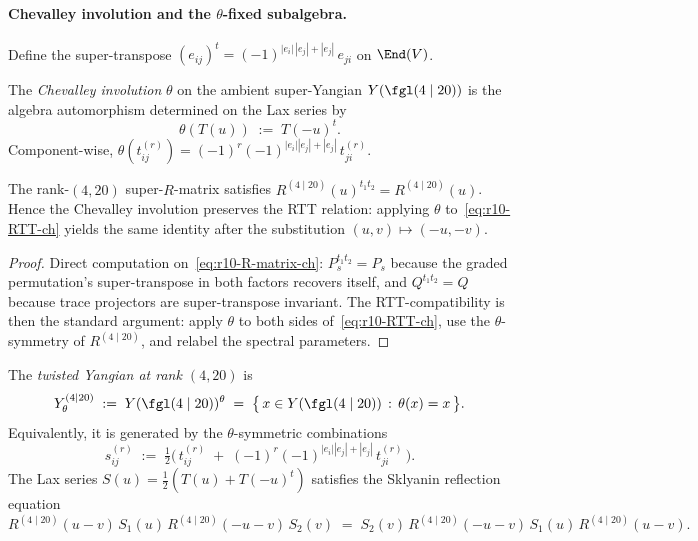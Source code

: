 \paragraph{Chevalley involution and the $\theta$-fixed subalgebra.}
Define the super-transpose
$(e_{ij})^t = (-1)^{|e_i|\,|e_j| + |e_j|}\, e_{ji}$ on $\End(V)$.

\begin{definition}
\label{def:r10-theta-ch}
The \emph{Chevalley involution} $\theta$ on the ambient super-Yangian
$Y(\fgl(4 \mid 20))$ is the algebra automorphism determined on the
Lax series by
\begin{equation}
 \label{eq:r10-theta-Lax-ch}
 \theta(T(u)) \;:=\; T(-u)^{t}.
\end{equation}
Component-wise,
$\theta(t^{(r)}_{ij}) = (-1)^r (-1)^{|e_i||e_j| + |e_j|}\, t^{(r)}_{ji}$.
\end{definition}

\begin{proposition}
\label{prop:r10-theta-R-symm-ch}
The rank-$(4, 20)$ super-$R$-matrix satisfies
$R^{(4 \mid 20)}(u)^{t_1 t_2} = R^{(4 \mid 20)}(u)$.
Hence the Chevalley involution preserves the RTT relation: applying
$\theta$ to~\eqref{eq:r10-RTT-ch} yields the same identity after the
substitution $(u, v) \mapsto (-u, -v)$.
\end{proposition}

\begin{proof}
Direct computation on~\eqref{eq:r10-R-matrix-ch}:
$P_s^{t_1 t_2} = P_s$ because the graded permutation's
super-transpose in both factors recovers itself, and
$Q^{t_1 t_2} = Q$ because trace projectors are super-transpose
invariant. The RTT-compatibility is then the standard argument:
apply $\theta$ to both sides of~\eqref{eq:r10-RTT-ch}, use the
$\theta$-symmetry of $R^{(4 \mid 20)}$, and relabel the spectral
parameters.
\end{proof}

\begin{definition}
\label{def:r10-Y-theta-ch}
The \emph{twisted Yangian at rank $(4, 20)$} is
\begin{equation}
 \label{eq:r10-Y-theta-ch}
 Y_\theta^{(4 \mid 20)}
 \;:=\;
 Y(\fgl(4 \mid 20))^\theta
 \;=\;
 \bigl\{\, x \in Y(\fgl(4 \mid 20)) \,:\, \theta(x) = x\, \bigr\}.
\end{equation}
Equivalently, it is generated by the $\theta$-symmetric combinations
\begin{equation}
 \label{eq:r10-s-generators-ch}
 s^{(r)}_{ij}
 \;:=\;
 \tfrac{1}{2}
 \bigl(\, t^{(r)}_{ij}
 \;+\; (-1)^r (-1)^{|e_i||e_j| + |e_j|}\, t^{(r)}_{ji} \,\bigr).
\end{equation}
The Lax series $S(u) = \tfrac{1}{2}(T(u) + T(-u)^t)$ satisfies the
Sklyanin reflection equation
\begin{equation}
 \label{eq:r10-reflection-eq-ch}
 R^{(4 \mid 20)}(u - v)\, S_1(u)\, R^{(4 \mid 20)}(-u - v)\,
 S_2(v)
 \;=\;
 S_2(v)\, R^{(4 \mid 20)}(-u - v)\, S_1(u)\, R^{(4 \mid 20)}(u - v).
\end{equation}
\end{definition}

